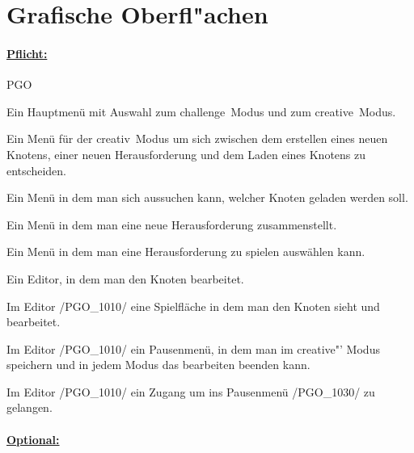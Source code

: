 %
%


%
%
\clearpage


\section{Grafische Oberfl{"a}chen}
\label{NU:GO}

\paragraph*{\underline{Pflicht:}}

\begin{ids}{\gls{PGO}}

	\id[0010] Ein Hauptmenü mit Auswahl zum \glqq challenge\grqq~Modus und zum \glqq creative\grqq~Modus.
	
	\id[0020] Ein Menü für der \glqq creativ\grqq~Modus um sich zwischen dem erstellen eines neuen Knotens, einer neuen Herausforderung und dem Laden eines Knotens zu entscheiden.
	
	\id[0030] Ein Menü in dem man sich aussuchen kann, welcher Knoten geladen werden soll.
	
	\id[0040] Ein Menü in dem man eine neue Herausforderung zusammenstellt.
	
	\id[0050] Ein Menü in dem man eine Herausforderung zu spielen auswählen kann.
	
	\id[1010] Ein Editor, in dem man den Knoten bearbeitet.
	
	\id[1020] Im Editor /PGO\_1010/ eine Spielfläche in dem man den Knoten sieht und bearbeitet.
	
	\id[1030] Im Editor /PGO\_1010/ ein Pausenmenü, in dem man im \glqq creative"' Modus speichern und in jedem Modus das bearbeiten beenden kann.
	
	\id[1040] Im Editor /PGO\_1010/ ein Zugang um ins Pausenmenü /PGO\_1030/ zu gelangen.

\end{ids}




\paragraph*{\underline{Optional:}}

